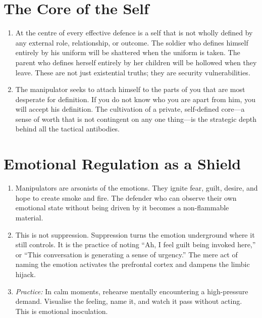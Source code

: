 \documentclass[12pt,a4paper,oneside]{book}
\begin{document}
\section{The Core of the Self}
\begin{enumerate}[leftmargin=*, label=\arabic*.]
\item At the centre of every effective defence is a self that is not wholly defined by any external role, relationship, or outcome. The soldier who defines himself entirely by his uniform will be shattered when the uniform is taken. The parent who defines herself entirely by her children will be hollowed when they leave. These are not just existential truths; they are security vulnerabilities.
\item The manipulator seeks to attach himself to the parts of you that are most desperate for definition. If you do not know who you are apart from him, you will accept his definition. The cultivation of a private, self-defined core—a sense of worth that is not contingent on any one thing—is the strategic depth behind all the tactical antibodies.
\end{enumerate}

\section{Emotional Regulation as a Shield}
\begin{enumerate}[leftmargin=*, label=\arabic*.]
\item Manipulators are arsonists of the emotions. They ignite fear, guilt, desire, and hope to create smoke and fire. The defender who can observe their own emotional state without being driven by it becomes a non-flammable material.
\item This is not suppression. Suppression turns the emotion underground where it still controls. It is the practice of noting “Ah, I feel guilt being invoked here,” or “This conversation is generating a sense of urgency.” The mere act of naming the emotion activates the prefrontal cortex and dampens the limbic hijack.
\item \textit{Practice:} In calm moments, rehearse mentally encountering a high-pressure demand. Visualise the feeling, name it, and watch it pass without acting. This is emotional inoculation.
\end{enumerate}
\end{document}
